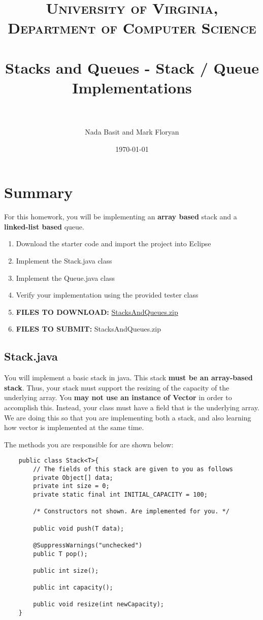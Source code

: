 \documentclass[paper=a4, fontsize=11pt, parskip=full]{scrartcl} %
\title{
\normalfont \normalsize
\textsc{University of Virginia, Department of Computer Science} \\ [25pt] %
\horrule{0.5pt} \\[0.4cm] %
\huge Stacks and Queues - Stack / Queue Implementations \\ %
\horrule{2pt} \\[0.5cm] %
}
\author{Nada Basit and Mark Floryan}
\date{\normalsize\today} %
\numberwithin{equation}{section} %
\numberwithin{figure}{section} %
\numberwithin{table}{section} %
\begin{document}
\maketitle %


\section{Summary}

For this homework, you will be implementing an \textbf{array based} stack and a \textbf{linked-list based} queue.

\begin{enumerate}
	\item Download the starter code and import the project into Eclipse
	\item Implement the Stack.java class
	\item Implement the Queue.java class
	\item Verify your implementation using the provided tester class
	\item \textbf{FILES TO DOWNLOAD:} \href{https://uva-cs.github.io/dsa1/homeworks/StacksAndQueues/code/StacksAndQueues.zip}{StacksAndQueues.zip}
	\item \textbf{FILES TO SUBMIT:} StacksAndQueues.zip
\end{enumerate}



\subsection{Stack.java}

You will implement a basic stack in java. This stack \textbf{must be an array-based stack}. Thus, your stack must support the resizing of the capacity of the underlying array. You \textbf{may not use an instance of Vector} in order to accomplish this. Instead, your class must have a field that is the underlying array. We are doing this so that you are implementing both a stack, and also learning how vector is implemented at the same time.

The methods you are responsible for are shown below:

\begin{lstlisting}
	public class Stack<T>{
		// The fields of this stack are given to you as follows
		private Object[] data;
		private int size = 0;
		private static final int INITIAL_CAPACITY = 100;

		/* Constructors not shown. Are implemented for you. */

		public void push(T data);

		@SuppressWarnings("unchecked")
		public T pop();

		public int size();

		public int capacity();

		public void resize(int newCapacity);
	}
\end{lstlisting}
\end{document}

